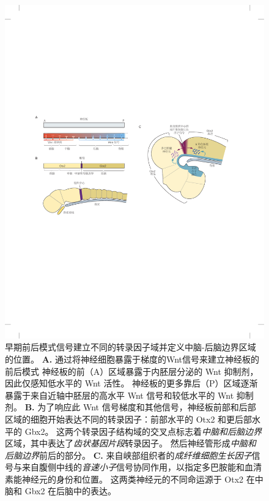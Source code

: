 \begin{figure}[htbp]
	\centering
	\includegraphics[width=1.0\linewidth]{chap45/fig_45_5}
	\caption{早期前后模式信号建立不同的转录因子域并定义中脑-后脑边界区域的位置。
		\textbf{A.} 通过将神经细胞暴露于梯度的Wnt信号来建立神经板的前后模式
		神经板的前（A）区域暴露于内胚层分泌的 Wnt 抑制剂，因此仅感知低水平的 Wnt 活性。
		神经板的更多靠后（P）区域逐渐暴露于来自近轴中胚层的高水平 Wnt 信号和较低水平的 Wnt 抑制剂。
		\textbf{B.} 为了响应此 Wnt 信号梯度和其他信号，神经板前部和后部区域的细胞开始表达不同的转录因子：前部水平的 Otx2 和更后部水平的 Gbx2。
		这两个转录因子结构域的交叉点标志着\textit{中脑和后脑边界}区域，其中表达了\textit{齿状基因片段}转录因子。
		然后神经管形成\textit{中脑和后脑边界}前后的部分。
		\textbf{C.} 来自峡部组织者的\textit{成纤维细胞生长因子}信号与来自腹侧中线的\textit{音速小子}信号协同作用，以指定多巴胺能和血清素能神经元的身份和位置。
		这两类神经元的不同命运源于 Otx2 在中脑和 Gbx2 在后脑中的表达\cite{wurst2001neural}。}
	\label{fig:45_5}
\end{figure}




